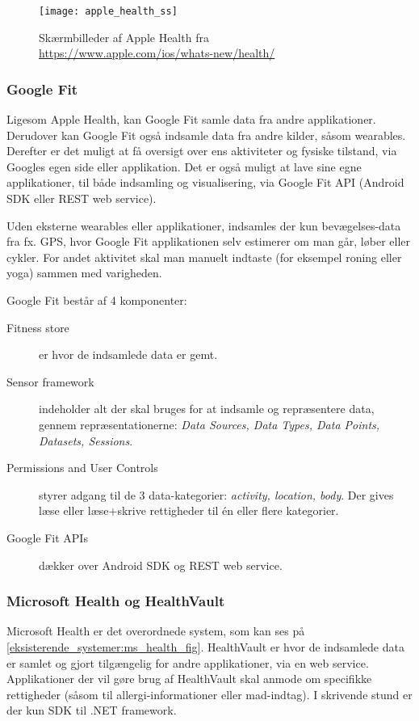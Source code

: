 \begin{figure}
\centering
\texttt{[image: apple\_health\_ss]}
\caption{Skærmbilleder af Apple Health fra \url{https://www.apple.com/ios/whats-new/health/}}
\label{eksisterende_systemer:apple_health_ss}
\end{figure}

\subsubsection{Google Fit}
Ligesom Apple Health, kan Google Fit samle data fra andre applikationer.
Derudover kan Google Fit også indsamle data fra andre kilder, såsom wearables.
Derefter er det muligt at få oversigt over ens aktiviteter og fysiske tilstand, via Googles egen side eller applikation.
Det er også muligt at lave sine egne applikationer, til både indsamling og visualisering, via Google Fit API (Android SDK eller REST web service).

Uden eksterne wearables eller applikationer, indsamles der kun bevægelses-data fra fx. GPS, hvor Google Fit applikationen selv estimerer om man går, løber eller cykler.
For andet aktivitet skal man manuelt indtaste (for eksempel roning eller yoga) sammen med varigheden.

Google Fit består af 4 komponenter:

\begin{description}
\item[Fitness store] er hvor de indsamlede data er gemt.
\item[Sensor framework] indeholder alt der skal bruges for at indsamle og repræsentere data, gennem repræsentationerne: \textit{Data Sources, Data Types, Data Points, Datasets, Sessions}.
\item[Permissions and User Controls] styrer adgang til de 3 data-kategorier: \textit{activity, location, body}.
Der gives læse eller læse+skrive rettigheder til én eller flere kategorier.
\item[Google Fit APIs] dækker over Android SDK og REST web service.
\end{description}

\subsubsection{Microsoft Health og HealthVault}
Microsoft Health er det overordnede system, som kan ses på \cref{eksisterende_systemer:ms_health_fig}.
HealthVault er hvor de indsamlede data er samlet og gjort tilgængelig for andre applikationer, via en web service.
Applikationer der vil gøre brug af HealthVault skal anmode om specifikke rettigheder (såsom til allergi-informationer eller mad-indtag).
I skrivende stund er der kun SDK til .NET framework.

